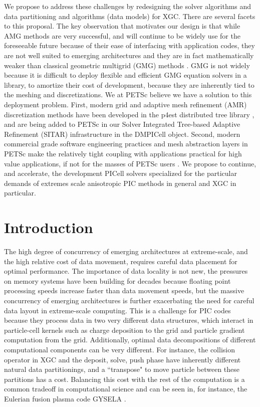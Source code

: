 \documentclass[review]{siamart}
\begin{document}
We propose to address these challenges by redesigning the solver algorithms and data partitioning and algorithms (data models) for XGC.
There are several facets to this proposal.
The key observation that motivates our design is that while AMG methods are very successful, and will continue to be widely use for the foreseeable future because of their ease of interfacing with application codes, they are not well suited to emerging architectures and they are in fact mathematically weaker than classical geometric multigrid (GMG) methods \cite{Brandt-77}.
GMG is not widely because it is difficult to deploy flexible and efficient GMG equation solvers in a library, to amortize their cost of development, because they are inherently tied to the meshing and discretizations.
We at PETSc believe we have a solution to this deployment problem.
First, modern grid and adaptive mesh refinement (AMR) discretization methods have been developed in the p4est distributed tree library \cite{DBLP:journals/siamsc/IsaacBWG15,Rudi:2015:EIS:2807591.2807675,Stadler1033}, and are being added to PETSc in our Solver Integrated Tree-based Adaptive Refinement (SITAR) infrastructure in the DMPICell object.
Second, modern commercial grade software engineering practices and mesh abstraction layers in PETSc make the relatively tight coupling with applications practical for high value applications, if not for the masses of PETSc users \cite{KnepleyBrownMcInnesSmithRuppAdams2015b}.
We propose to continue, and accelerate, the development PICell solvers specialized for the particular demands of extremes scale anisotropic PIC methods in general and XGC in particular.

\section{Introduction}

The high degree of concurrency of emerging architectures at extreme-scale, and the high relative cost of data movement, requires careful data placement for optimal performance.
The importance of data locality is not new, the pressures on memory systems have been building for decades because floating point processing speeds increase faster than data movement speeds, but the massive concurrency of emerging architectures is further exacerbating the need for careful data layout in extreme-scale computing.
This is a challenge for PIC codes because they process data in two very different data structures, which interact in particle-cell kernels such as charge deposition to the grid and particle gradient computation from the grid.
Additionally, optimal data decompositions of different computational components can be very different.
For instance, the collision operator in XGC and the deposit, solve, push phase have inherently different natural data partitionings, and a ``transpose" to move particle between these partitions has a cost.
Balancing this cost with the rest of the computation is a common tradeoff in computational science and can be seen in, for instance, the Eulerian fusion plasma code GYSELA \cite{Bigot13}.
\end{document}
